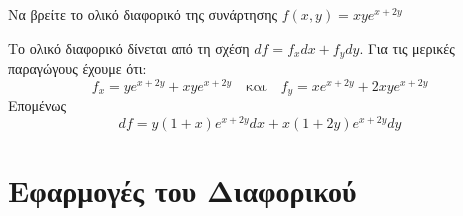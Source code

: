 
\begin{example}
  Να βρείτε το ολικό διαφορικό της συνάρτησης $ f(x,y) = xye^{x+2y} $ 
  \begin{solution}
  \item {}
    Το ολικό διαφορικό δίνεται από τη σχέση $ df = f_{x} dx + f_{y} dy $.  
    Για τις μερικές παραγώγους έχουμε ότι: 
    \[
      f_{x} = ye^{x+2y}+xye^{x+2y} \quad \text{και} \quad f_{y} = xe^{x+2y} +
      2xye^{x+2y}
    \] 
    Επομένως
    \[
      df = y(1+x)e^{x+2y} dx + x(1+2y)e^{x+2y}dy
    \]
  \end{solution}
\end{example}

\section{Εφαρμογές του Διαφορικού}


